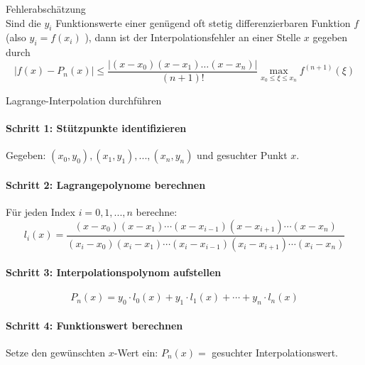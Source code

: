 \begin{corollary}{Fehlerabschätzung}\\
Sind die $y_i$ Funktionswerte einer genügend oft stetig differenzierbaren Funktion $f$ (also $y_i=f(x_i)$ ), 
dann ist der Interpolationsfehler an einer Stelle $x$ gegeben durch
$$
\left|f(x)-P_n(x)\right| \leq \frac{\left|(x-x_0)(x-x_1) \ldots(x-x_n)\right|}{(n+1)!} \max _{x_0 \leq \xi \leq x_n} f^{(n+1)}(\xi)
$$
\end{corollary}

\begin{KR}{Lagrange-Interpolation durchführen}
\paragraph{Schritt 1: Stützpunkte identifizieren}
Gegeben: $(x_0, y_0), (x_1, y_1), ..., (x_n, y_n)$ und gesuchter Punkt $x$.
\paragraph{Schritt 2: Lagrangepolynome berechnen}
Für jeden Index $i = 0, 1, ..., n$ berechne:
$$l_i(x) = \frac{(x-x_0)(x-x_1)\cdots(x-x_{i-1})(x-x_{i+1})\cdots(x-x_n)}{(x_i-x_0)(x_i-x_1)\cdots(x_i-x_{i-1})(x_i-x_{i+1})\cdots(x_i-x_n)}$$
\paragraph{Schritt 3: Interpolationspolynom aufstellen}
\vspace{-2mm}
$$P_n(x) = y_0 \cdot l_0(x) + y_1 \cdot l_1(x) + \cdots + y_n \cdot l_n(x)$$
\paragraph{Schritt 4: Funktionswert berechnen}
Setze den gewünschten $x$-Wert ein: $P_n(x) = $ gesuchter Interpolationswert.
\end{KR}

